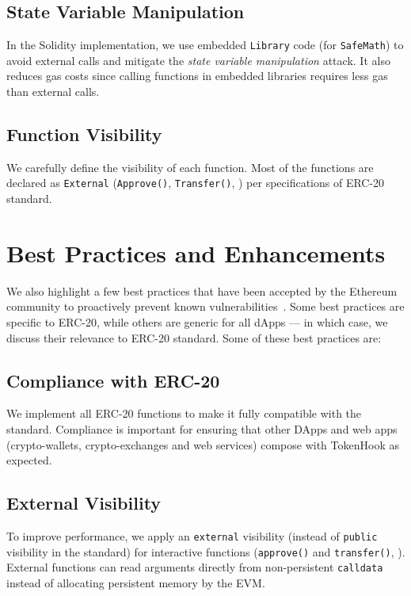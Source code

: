 \subsection*{State Variable Manipulation} In the Solidity implementation, we use embedded \texttt{Library} code (for \texttt{SafeMath}) to avoid external calls and mitigate the \textit{state variable manipulation} attack. It also reduces gas costs since calling functions in embedded libraries requires less gas than external calls.

\subsection*{Function Visibility} We carefully define the visibility of each function. Most of the functions are declared as \texttt{External} (\eg \texttt{Approve()}, \texttt{Transfer()}, \etc) per specifications of ERC-20 standard.

\section{Best Practices and Enhancements}
We also highlight a few best practices that have been accepted by the Ethereum community to proactively prevent known vulnerabilities~\cite{TokenBP}. Some best practices are specific to ERC-20, while others are generic for all dApps --- in which case, we discuss their relevance to ERC-20 standard. Some of these best practices are:

\subsection*{Compliance with ERC-20} We implement all ERC-20 functions to make it fully compatible with the standard. Compliance is important for ensuring that other DApps and web apps (\ie crypto-wallets, crypto-exchanges and web services) compose with TokenHook as expected. 

\subsection*{External Visibility} To improve performance, we apply an \texttt{external} visibility (instead of \texttt{public} visibility in the standard) for interactive functions (\eg \texttt{approve()} and \texttt{transfer()}, \etc).  External functions can read arguments directly from non-persistent \texttt{calldata} instead of allocating persistent memory by the EVM. 

